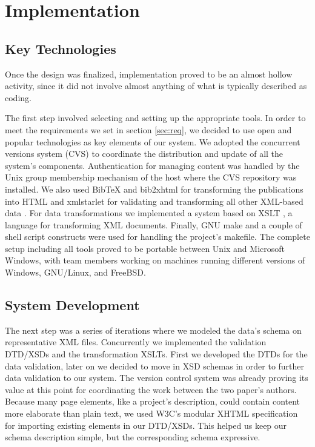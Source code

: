 \documentclass[10pt]{article}
\begin{document}
\section{Implementation}

\subsection{Key Technologies}

Once the design was finalized,
implementation proved to be an almost hollow activity,
since it did not involve almost anything of what
is typically described as coding.

The first step involved selecting and setting up the
appropriate tools. In order to meet the requirements we set in section \ref{sec:req}, 
we decided to use open and popular
technologies as key elements of our system.
We adopted the concurrent versions system
({\sc CVS}) \cite{BF01} \cite{CVS} to coordinate the distribution
and update of all the system's components.
Authentication for managing content was handled by the
Unix group membership mechanism of the host where the
{\sc CVS} repository was installed.
We also used
{\sc BibTeX} \cite{Pa88} \cite{Lam94} and {\sc bib2xhtml} \cite{BibXHMTL} for transforming the publications
into {\sc HTML} and
xmlstarlet \cite{Gru04} for validating and transforming
all other {\sc XML}-based data \cite{W3C_XML}.
For data transformations we 
implemented a system based on XSLT \cite{W3C_XSLT}, a language for transforming XML documents.
Finally, {\sc GNU} make \cite{gnu_make} and a couple of shell script
constructs were used for handling the project's makefile.
The complete setup including all tools proved to be portable
between Unix and Microsoft Windows, with team members working
on machines running different versions of {\sc Windows}, {\sc GNU/Linux},
and {\sc FreeBSD}.

\subsection{System Development}

The next step was a series of iterations where we
modeled the data's schema on representative {\sc XML}
files. Concurrently we implemented the validation {\sc DTD/XSDs}
and the transformation {\sc XSLTs}. First we developed the {\sc DTDs}
for the data validation, later on we decided to move in {\sc XSD} schemas in order to
further data validation to our system.
The version control system was already proving its value
at this point
for coordinating the work between the two paper's authors.
Because many page elements, like a project's description,
could contain content more elaborate than plain text,
we used W3C's modular {\sc XHTML} specification for
importing existing elements in our {\sc DTD/XSDs}.
This helped us keep our schema description simple,
but the corresponding schema expressive.
\end{document}
